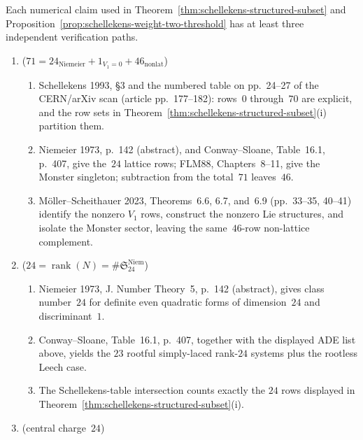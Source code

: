 \begin{remark}
\label{rem:schellekens-numerical-record}
Each numerical claim used in
Theorem~\ref{thm:schellekens-structured-subset} and
Proposition~\ref{prop:schellekens-weight-two-threshold} has at least
three independent verification paths.
\begin{enumerate}[label=\textup{(\arabic*)},leftmargin=*]
\item \textup{(}$71 = 24_{\mathrm{Niemeier}} + 1_{V_1=0} +
46_{\mathrm{nonlat}}$\textup{)}
 \begin{enumerate}[label=\textup{(\alph*)},leftmargin=*]
 \item Schellekens 1993, §3 and the numbered table on pp.~24--27 of the
 CERN/arXiv scan \textup{(}article pp.~177--182\textup{)}:
 rows~$0$ through~$70$ are
 explicit, and the row sets in
 Theorem~\ref{thm:schellekens-structured-subset}(i) partition them.
 \item Niemeier 1973, p.~142 \textup{(}abstract\textup{)}, and
 Conway--Sloane, Table~16.1, p.~407, give the~$24$ lattice rows;
 FLM88, Chapters~8--11, give the Monster singleton; subtraction from
 the total~$71$ leaves~$46$.
 \item M\"oller--Scheithauer 2023, Theorems~6.6, 6.7, and~6.9
 \textup{(}pp.~33--35, 40--41\textup{)} identify the nonzero
 $V_1$ rows, construct the nonzero Lie structures, and isolate
 the Monster sector, leaving the same~$46$-row non-lattice complement.
 \end{enumerate}
\item \textup{(}$24 = \operatorname{rank}(N) = \#\mathfrak{S}_{24}^{\mathrm{Niem}}$\textup{)}
 \begin{enumerate}[label=\textup{(\alph*)},leftmargin=*]
 \item Niemeier 1973, J. Number Theory~5, p.~142 \textup{(}abstract\textup{)},
 gives class number~$24$ for definite even quadratic forms of
 dimension~$24$ and discriminant~$1$.
 \item Conway--Sloane, Table~16.1, p.~407, together with the displayed
 ADE list above, yields the $23$ rootful simply-laced rank-$24$
 systems plus the rootless Leech case.
 \item The Schellekens-table intersection counts exactly the
 $24$ rows displayed in
 Theorem~\ref{thm:schellekens-structured-subset}(i).
 \end{enumerate}
\item \textup{(}central charge~$24$\textup{)}
 \begin{enumerate}[label=\textup{(\alph*)},leftmargin=*]

\end{enumerate}
\end{enumerate}
\end{remark}
